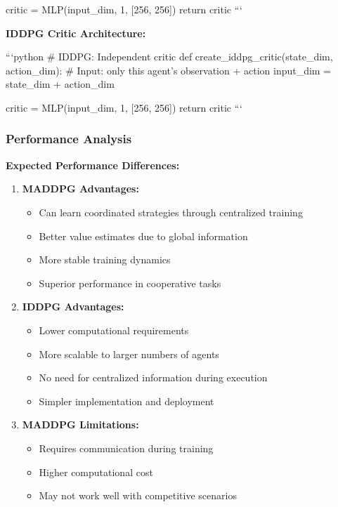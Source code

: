 \documentclass[12pt]{article}
\begin{document}
{{{{{{    critic = MLP(input_dim, 1, [256, 256])
    return critic
```

\textbf{IDDPG Critic Architecture:}

```python
# IDDPG: Independent critic
def create_iddpg_critic(state_dim, action_dim):
    # Input: only this agent's observation + action
    input_dim = state_dim + action_dim
    
    critic = MLP(input_dim, 1, [256, 256])
    return critic
```

\subsubsection{Performance Analysis}

\textbf{Expected Performance Differences:}

\begin{enumerate}
    \item \textbf{MADDPG Advantages:}
    \begin{itemize}
        \item Can learn coordinated strategies through centralized training
        \item Better value estimates due to global information
        \item More stable training dynamics
        \item Superior performance in cooperative tasks
    \end{itemize}
    
    \item \textbf{IDDPG Advantages:}
    \begin{itemize}
        \item Lower computational requirements
        \item More scalable to larger numbers of agents
        \item No need for centralized information during execution
        \item Simpler implementation and deployment
    \end{itemize}
    
    \item \textbf{MADDPG Limitations:}
    \begin{itemize}
        \item Requires communication during training
        \item Higher computational cost
        \item May not work well with competitive scenarios
    \end{itemize}
    

\end{enumerate}}}}}}}
\end{document}
